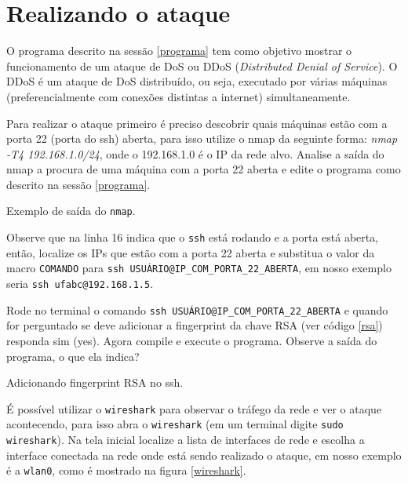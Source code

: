 \documentclass[12pt]{abnt}
\begin{document}
\section{Realizando o ataque}

O programa descrito na sessão \ref{programa} tem como objetivo mostrar o funcionamento de um ataque de
DoS ou DDoS (\textit{Distributed Denial of Service}). O DDoS é um ataque de DoS distribuído, ou seja,
executado por várias máquinas (preferencialmente com conexões distintas a internet) simultaneamente.

Para realizar o ataque primeiro é preciso descobrir quais máquinas estão com a porta 22 (porta do ssh)
aberta, para isso utilize o nmap da seguinte forma: \textit{nmap -T4 192.168.1.0/24}, onde o 192.168.1.0
é o IP da rede alvo. Analise a saída
do nmap a procura de uma máquina com a porta 22 aberta e edite o programa como descrito na sessão \ref{programa}.

\renewcommand{\baselinestretch}{0.5}  %
\begin{codigo}[!hbt]
   \tiny  %
   \caption{Exemplo de saída do \texttt{nmap}.}
   \label{nmap}
\end{codigo}

Observe que na linha 16 indica que o \texttt{ssh} está rodando e a porta está aberta, então, localize os IPs que estão com a porta 22 
aberta e substitua o valor da macro \texttt{COMANDO} para \texttt{ssh USUÁRIO@IP\_COM\_PORTA\_22\_ABERTA}, em nosso exemplo seria
\texttt{ssh ufabc@192.168.1.5}. 

Rode no terminal o comando \texttt{ssh USUÁRIO@IP\_COM\_PORTA\_22\_ABERTA} e quando for perguntado se deve adicionar a fingerprint
da chave RSA (ver código 
\ref{rsa}) responda sim (yes).
Agora compile e execute o programa. Observe a saída do programa, o que ela indica?

\renewcommand{\baselinestretch}{0.5}  %
\begin{codigo}[!hbt]
   \tiny  %
   \caption{Adicionando fingerprint RSA no ssh.}
   \label{rsa}
\end{codigo}



É possível utilizar o \texttt{wireshark} para observar o tráfego da rede e ver o ataque acontecendo, para isso abra o \texttt{wireshark}
(em um terminal digite \texttt{sudo wireshark}). Na tela inicial localize a lista de interfaces de rede e escolha a interface conectada na
rede onde está sendo realizado o ataque, em nosso exemplo é a \texttt{wlan0}, como é mostrado na figura \ref{wireshark}.
\end{document}
